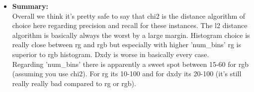 \documentclass[12pt]{article}
\begin{document}
\begin{enumerate}[a)]
\begin{itemize}
            \item
                \textbf{Summary:}\\
                Overall we think it's pretty safe to say that chi2 is the distance algorithm of choice here regarding precision and recall for these instances. The l2 distance algorithm is basically always the worst by a large margin. Histogram choice is really close between rg and rgb but especially with higher 'num\_bins' rg is superior to rgb histogram. Dxdy is worse in basically every case.\\
                Regarding 'num\_bins' there is apparently a sweet spot between 15-60 for rgb (assuming you use chi2). For rg its 10-100 and for dxdy its 20-100 (it's still really really bad compared to rg or rgb).
        \end{itemize}
\end{enumerate}
\end{document}
